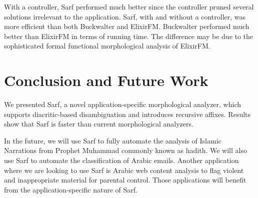 \documentclass[11pt]{article}
\begin{document}
With a controller, Sarf performed much better since the controller pruned several solutions irrelevant to the application. 
Sarf, with and without a controller, was more efficient than both Buckwalter and ElixirFM. 
Buckwalter performed much better than ElixirFM in 
terms of running time. 
The difference may be due to the sophisticated formal 
functional morphological analysis of ElixirFM. 

\section{Conclusion and Future Work}
\label{sec:future}

We presented Sarf, a novel application-specific morphological analyzer,
which supports diacritic-based disambiguation and introduces recursive affixes.
Results show that Sarf is faster than
current morphological analyzers.

In the future, we will use Sarf to fully automate the analysis of Islamic Narrations 
from Prophet Muhammad commonly known as hadith.
We will also use Sarf to automate the classification of
Arabic emails. Another application where we are looking to use Sarf is
Arabic web content analysis to flag violent and inappropriate material for parental control.
Those applications will benefit from the application-specific nature of Sarf.


\end{document}
